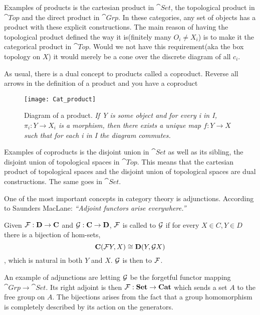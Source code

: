 \documentclass[../../main.tex]{subfiles}
\begin{document}
    Examples of products is the cartesian product in $\cat{Set}$, the topological product in $\cat{Top}$ and the direct product in $\cat{Grp}$. In these categories, any set of objects has a product with these explicit constructions. The main reason of having the topological product defined the way it is(finitely many $O_i \neq X_i$) is to make it the categorical product in $\cat{Top}$. Would we not have this requirement(aka the box topology on $X$) it would merely be a cone over the discrete diagram of all $c_i$.
    
    As usual, there is a dual concept to products called a coproduct. Reverse all arrows in the definition of a product and you have a coproduct
    
    \begin{figure}[h]
        \centering
        \texttt{[image: Cat\_product]}
        \caption{Diagram of a product. \textit{If Y is some object and for every i in I, $\pi_i:Y\to X_i$ is a morphism, then there exists a unique map $f:Y\to X$ such that for each i in I the diagram commutes.}}
        \label{fig:product}
    \end{figure}

    Examples of coproducts is the disjoint union in $\cat{Set}$ as well as its sibling, the disjoint union of topological spaces in $\cat{Top}$. This means that the cartesian product of topological spaces and the disjoint union of topological spaces are dual constructions. The same goes in $\cat{Set}$.
    
    One of the most important concepts in category theory is adjunctions. According to Saunders MacLane: \textit{“Adjoint functors arise everywhere.”}
    
    \begin{definition}
        Given $\mathcal{F}: \mathbf{D} \to \mathbf{C}$ and $\mathcal{G}: \mathbf{C} \to \mathbf{D}$, $\mathcal{F}$ is called  to $\mathcal{G}$ if for every $X \in C, Y \in D$ there is a bijection of hom-sets, $$\mathbf{C}(\mathcal{F}Y, X) \cong \mathbf{D}(Y, \mathcal{G}X)$$, which is natural in both $Y$ and $X$. $\mathcal{G}$ is then  to $\mathcal{F}$.
    \end{definition}
    
    An example of adjunctions are letting $\mathcal{G}$ be the forgetful functor mapping $\cat{Grp} \to \cat{Set}$. Its right adjoint is then $\mathcal{F}: \mathbf{Set} \to \mathbf{Cat}$ which sends a set $A$ to the free group on $A$. The bijections arises from the fact that a group homomorphism is completely described by its action on the generators.
    
\end{document}
